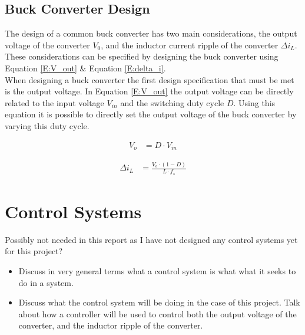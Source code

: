 \subsection{Buck Converter Design}

The design of a common buck converter has two main considerations, the output voltage of the converter $V_0$, and the inductor current ripple of the converter $\Delta i_L$. These considerations can be specified by designing the buck converter using Equation \ref{E:V_out} \& Equation \ref{E:delta_i}.\\ 

When designing a buck converter the first design specification that must be met is the output voltage. In Equation \ref{E:V_out} the output voltage can be directly related to the input voltage $V_{in}$ and the switching duty cycle $D$. Using this equation it is possible to directly set the output voltage of the buck converter by varying this duty cycle.

\begin{align}\label{E:V_out}
      V_o &= D \cdot V_{in}
\end{align}



\begin{align}\label{E:delta_i}
   \Delta i_L &= \frac{ V_{o} \cdot \left( 1 - D \right) } {L \cdot f_s}
\end{align}


\section{Control Systems}\label{S:control}

Possibly not needed in this report as I have not designed any control systems yet for this project?

\begin{itemize}

    \item
          Discuss in very general terms what a control system is what what it seeks to do in a system.

    \item
          Discuss what the control system will be doing in the case of this project. Talk about how a controller will be used to control both the output voltage of the converter, and the inductor ripple of the converter.

\end{itemize}